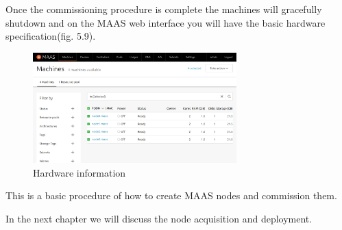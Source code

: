 Once the commissioning procedure is complete the machines will gracefully shutdown and on the MAAS web interface you will have the basic hardware specification(fig. 5.9).

\begin{figure}[!ht]
    \centering
    \includegraphics[width=0.7\textwidth]{images/5-9.png}
    \caption{Hardware information}
\end{figure}

This is a basic procedure of how to create MAAS nodes and commission them.

In the next chapter we will discuss the node acquisition and deployment.